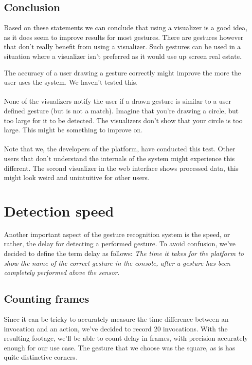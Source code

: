 \documentclass[a4paper]{article}
\begin{document}
  \subsection{Conclusion}
  Based on these statements we can conclude that using a visualizer is a good
  idea, as it does seem to improve results for most gestures. There are gestures
  however that don't really benefit from using a visualizer. Such gestures can
  be used in a situation where a visualizer isn't preferred as it would use up
  screen real estate.

  The accuracy of a user drawing a gesture correctly might improve the more the
  user uses the system. We haven't tested this.

  \paragraph{}
  None of the visualizers notify the user if a drawn gesture is similar to a
  user defined gesture (but is not a match). Imagine that you're drawing a
  circle, but too large for it to be detected. The visualizers don't show that
  your circle is too large. This might be something to improve on.

  \paragraph{}
  Note that we, the developers of the platform, have conducted this test. Other
  users that don't understand the internals of the system might experience this
  different. The second visualizer in the web interface shows processed data,
  this might look weird and unintuitive for other users.

  \clearpage

  \section{Detection speed}
  Another important aspect of the gesture recognition system is the speed, or
  rather, the delay for detecting a performed gesture. To avoid confusion, we've
  decided to define the term delay as follows: \textit{The time it takes for the
    platform to show the name of the correct gesture in the console, after a
    gesture has been completely performed above the sensor}.

  \subsection{Counting frames}
  Since it can be tricky to accurately measure the time difference between an
  invocation and an action, we've decided to record 20 invocations.
  With the resulting footage, we'll be able to count delay in
  frames, with precision accurately enough for our use case. The gesture that we
  choose was the square, as is has quite distinctive corners.
\end{document}
